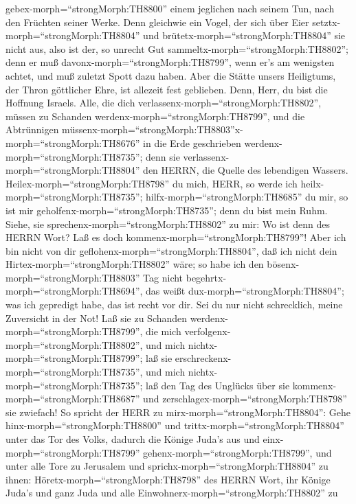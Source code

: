 gebex-morph=``strongMorph:TH8800'' einem jeglichen nach seinem Tun, nach
den Früchten seiner Werke.  Denn gleichwie ein Vogel, der
sich über Eier setztx-morph=``strongMorph:TH8804'' und
brütetx-morph=``strongMorph:TH8804'' sie nicht aus, also ist der, so
unrecht Gut sammeltx-morph=``strongMorph:TH8802''; denn er muß
davonx-morph=``strongMorph:TH8799'', wenn er's am wenigsten achtet, und
muß zuletzt Spott dazu haben.  Aber die Stätte unsers
Heiligtums, der Thron göttlicher Ehre, ist allezeit fest geblieben.
 Denn, Herr, du bist die Hoffnung Israels. Alle, die dich
verlassenx-morph=``strongMorph:TH8802'', müssen zu Schanden
werdenx-morph=``strongMorph:TH8799'', und die Abtrünnigen
müssenx-morph=``strongMorph:TH8803''\textbar x-morph=``strongMorph:TH8676''
in die Erde geschrieben werdenx-morph=``strongMorph:TH8735''; denn sie
verlassenx-morph=``strongMorph:TH8804'' den HERRN, die Quelle des
lebendigen Wassers.  Heilex-morph=``strongMorph:TH8798'' du
mich, HERR, so werde ich heilx-morph=``strongMorph:TH8735'';
hilfx-morph=``strongMorph:TH8685'' du mir, so ist mir
geholfenx-morph=``strongMorph:TH8735''; denn du bist mein Ruhm.
 Siehe, sie sprechenx-morph=``strongMorph:TH8802'' zu mir:
Wo ist denn des HERRN Wort? Laß es doch
kommenx-morph=``strongMorph:TH8799''!  Aber ich bin nicht
von dir geflohenx-morph=``strongMorph:TH8804'', daß ich nicht dein
Hirtex-morph=``strongMorph:TH8802'' wäre; so habe ich den
bösenx-morph=``strongMorph:TH8803'' Tag nicht
begehrtx-morph=``strongMorph:TH8694'', das weißt
dux-morph=``strongMorph:TH8804''; was ich gepredigt habe, das ist recht
vor dir.  Sei du nur nicht schrecklich, meine Zuversicht in
der Not!  Laß sie zu Schanden
werdenx-morph=``strongMorph:TH8799'', die mich
verfolgenx-morph=``strongMorph:TH8802'', und mich
nichtx-morph=``strongMorph:TH8799''; laß sie
erschreckenx-morph=``strongMorph:TH8735'', und mich
nichtx-morph=``strongMorph:TH8735''; laß den Tag des Unglücks über sie
kommenx-morph=``strongMorph:TH8687'' und
zerschlagex-morph=``strongMorph:TH8798'' sie zwiefach!  So
spricht der HERR zu mirx-morph=``strongMorph:TH8804'': Gehe
hinx-morph=``strongMorph:TH8800'' und
trittx-morph=``strongMorph:TH8804'' unter das Tor des Volks, dadurch die
Könige Juda's aus und einx-morph=``strongMorph:TH8799''
gehenx-morph=``strongMorph:TH8799'', und unter alle Tore zu Jerusalem
 und sprichx-morph=``strongMorph:TH8804'' zu ihnen:
Höretx-morph=``strongMorph:TH8798'' des HERRN Wort, ihr Könige Juda's
und ganz Juda und alle Einwohnerx-morph=``strongMorph:TH8802'' zu
